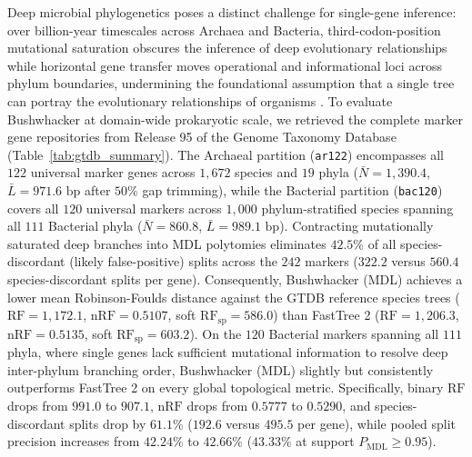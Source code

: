 \documentclass[11pt,a4paper]{article}
\begin{document}
Deep microbial phylogenetics poses a distinct challenge for single-gene inference: over billion-year timescales across Archaea and Bacteria, third-codon-position mutational saturation obscures the inference of deep evolutionary relationships while horizontal gene transfer moves operational and informational loci across phylum boundaries, undermining the foundational assumption that a single tree can portray the evolutionary relationships of organisms \citep{jain1999horizontal,woese2000aminoacyl}. To evaluate Bushwhacker at domain-wide prokaryotic scale, we retrieved the complete marker gene repositories from Release 95 of the Genome Taxonomy Database \citep{parks2018gtdb,parks2020gtdb} (Table~\ref{tab:gtdb_summary}). The Archaeal partition (\texttt{ar122}) encompasses all $122$ universal marker genes across $1,672$ species and $19$ phyla ($\bar{N} = 1,390.4$, $\bar{L} = 971.6\text{ bp}$ after $50\%$ gap trimming), while the Bacterial partition (\texttt{bac120}) covers all $120$ universal markers across $1,000$ phylum-stratified species spanning all $111$ Bacterial phyla ($\bar{N} = 860.8$, $\bar{L} = 989.1\text{ bp}$). Contracting mutationally saturated deep branches into MDL polytomies eliminates $42.5\%$ of all species-discordant (likely false-positive) splits across the $242$ markers ($322.2$ versus $560.4$ species-discordant splits per gene). Consequently, Bushwhacker (MDL) achieves a lower mean Robinson-Foulds distance against the GTDB reference species trees ($\text{RF} = 1,172.1$, $\text{nRF} = 0.5107$, soft $\text{RF}_{\text{sp}} = 586.0$) than FastTree 2 ($\text{RF} = 1,206.3$, $\text{nRF} = 0.5135$, soft $\text{RF}_{\text{sp}} = 603.2$). On the $120$ Bacterial markers spanning all $111$ phyla, where single genes lack sufficient mutational information to resolve deep inter-phylum branching order, Bushwhacker (MDL) slightly but consistently outperforms FastTree 2 on every global topological metric. Specifically, binary $\text{RF}$ drops from $991.0$ to $907.1$, $\text{nRF}$ drops from $0.5777$ to $0.5290$, and species-discordant splits drop by $61.1\%$ ($192.6$ versus $495.5$ per gene), while pooled split precision increases from $42.24\%$ to $42.66\%$ ($43.33\%$ at support $P_{\text{MDL}} \ge 0.95$).
\end{document}
